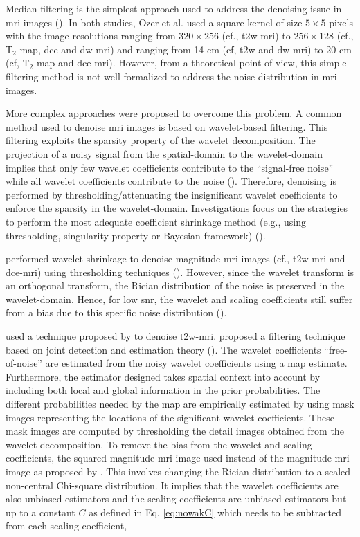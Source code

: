 \begin{enumerate}[leftmargin=*]
Median filtering is the simplest approach used to address the denoising issue in \ac{mri} images (\cite{Ozer2009,Ozer2010}). In both studies, Ozer et al. used a square kernel of size $5 \times 5$ pixels with the image resolutions ranging from $320 \times 256$ (cf., \ac{t2w} \ac{mri}) to $256 \times 128$ (cf., T$_2$ map, \ac{dce} and \ac{dw} \ac{mri}) and  ranging from 14 cm (cf, \ac{t2w} and \ac{dw} \ac{mri}) to 20 cm (cf, T$_2$ map and \ac{dce} \ac{mri}). However, from a theoretical point of view, this simple filtering method is not well formalized to address the noise distribution in \ac{mri} images.

More complex approaches were proposed to overcome this problem. A common method used to denoise \ac{mri} images is based on wavelet-based filtering. This filtering exploits the sparsity property of the wavelet decomposition. The projection of a noisy signal from the spatial-domain to the wavelet-domain implies that only few wavelet coefficients contribute to the ``signal-free noise'' while all wavelet coefficients contribute to the noise (\cite{Donoho1994}). Therefore, denoising is performed by thresholding/attenuating the insignificant wavelet coefficients to enforce the sparsity in the wavelet-domain. Investigations focus on the strategies to perform the most adequate coefficient shrinkage method (e.g., using thresholding, singularity property or Bayesian framework) (\cite{Pizurica2002}).

\cite{Ampeliotis2007,Ampeliotis2008} performed wavelet shrinkage to denoise magnitude \ac{mri} images (cf., \ac{t2w}-\ac{mri} and \ac{dce}-\ac{mri}) using thresholding techniques (\cite{Mallat2008}). However, since the wavelet transform is an orthogonal transform, the Rician distribution of the noise is preserved in the wavelet-domain. Hence, for low \ac{snr}, the wavelet and scaling coefficients still suffer from a bias due to this specific noise distribution (\cite{Nowak1999}). 

\cite{Lopes2011} used a technique proposed by \cite{Pizurica2003} to denoise \ac{t2w}-\ac{mri}. \cite{Pizurica2003} proposed a filtering technique based on joint detection and estimation theory (\cite{Middleton1968}). The wavelet coefficients ``free-of-noise'' are estimated from the noisy wavelet coefficients using a \ac{map} estimate. Furthermore, the estimator designed takes spatial context into account by including both local and global information in the prior probabilities. The different probabilities needed by the \ac{map} are empirically estimated by using mask images representing the locations of the significant wavelet coefficients. These mask images are computed by thresholding the detail images obtained from the wavelet decomposition. To remove the bias from the wavelet and scaling coefficients, the squared magnitude \ac{mri} image used instead of the magnitude \ac{mri} image as proposed by \cite{Nowak1999}. This involves changing the Rician distribution to a scaled non-central Chi-square distribution. It implies that the wavelet coefficients are also unbiased estimators and the scaling coefficients are unbiased estimators but up to a constant $C$ as defined in Eq. \eqref{eq:nowakC} which needs to be subtracted from each scaling coefficient,


\end{enumerate}
